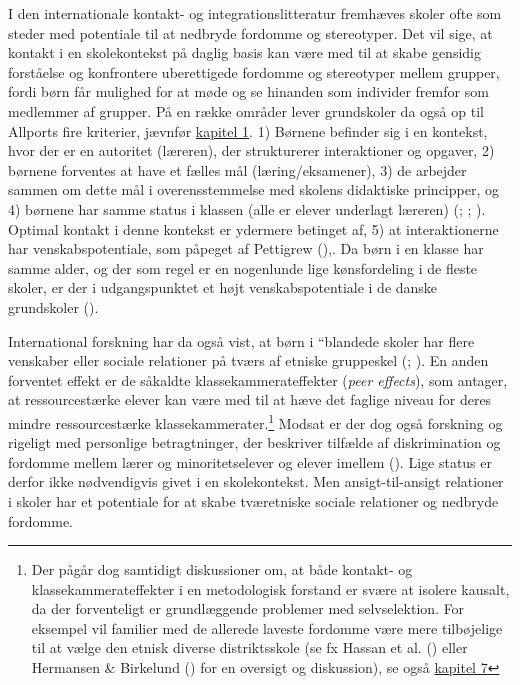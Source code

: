 \documentclass[
]{book}
\begin{document}
I den internationale kontakt- og integrationslitteratur fremhæves skoler ofte som steder med potentiale til at nedbryde fordomme og stereotyper. Det vil sige, at kontakt i en skolekontekst på daglig basis kan være med til at skabe gensidig forståelse og konfrontere uberettigede fordomme og stereotyper mellem grupper, fordi børn får mulighed for at møde og se hinanden som individer fremfor som medlemmer af grupper. På en række områder lever grundskoler da også op til Allports fire kriterier, jævnfør \hyperref[kap1]{kapitel 1}. 1) Børnene befinder sig i en kontekst, hvor der er en autoritet (læreren), der strukturerer interaktioner og opgaver, 2) børnene forventes at have et fælles mål (læring/eksamener), 3) de arbejder sammen om dette mål i overensstemmelse med skolens didaktiske principper, og 4) børnene har samme status i klassen (alle er elever underlagt læreren) (; ; ). Optimal kontakt i denne kontekst er ydermere betinget af, 5) at interaktionerne har venskabspotentiale, som påpeget af Pettigrew (),. Da børn i en klasse har samme alder, og der som regel er en nogenlunde lige kønsfordeling i de fleste skoler, er der i udgangspunktet et højt venskabspotentiale i de danske grundskoler ().

International forskning har da også vist, at børn i ``blandede skoler har flere venskaber eller sociale relationer på tværs af etniske gruppeskel (; ). En anden forventet effekt er de såkaldte klassekammerateffekter (\emph{peer effects}), som antager, at ressourcestærke elever kan være med til at hæve det faglige niveau for deres mindre ressourcestærke klassekammerater.\footnote{Der pågår dog samtidigt diskussioner om, at både kontakt- og klassekammerateffekter i en metodologisk forstand er svære at isolere kausalt, da der forventeligt er grundlæggende problemer med selvselektion. For eksempel vil familier med de allerede laveste fordomme være mere tilbøjelige til at vælge den etnisk diverse distriktsskole (se fx Hassan et al. () eller Hermansen \& Birkelund () for en oversigt og diskussion), se også \hyperref[kap7]{kapitel 7}} Modsat er der dog også forskning og rigeligt med personlige betragtninger, der beskriver tilfælde af diskrimination og fordomme mellem lærer og minoritetselever og elever imellem (). Lige status er derfor ikke nødvendigvis givet i en skolekontekst. Men ansigt-til-ansigt relationer i skoler har et potentiale for at skabe tværetniske sociale relationer og nedbryde fordomme.
\end{document}
